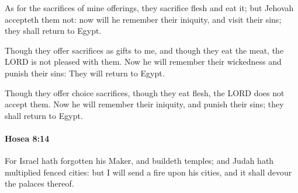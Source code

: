 			\begin{versebox}
					\item[BHS] 
					\item[LXX] 
					\item[ASV] As for the sacrifices of mine offerings, they sacrifice flesh and eat it; but Jehovah accepteth them not: now will he remember their iniquity, and visit their sins; they shall return to Egypt.
					\item[NIV] Though they offer sacrifices as gifts to me, and though they eat the meat, the LORD is not pleased with them. Now he will remember their wickedness and punish their sins: They will return to Egypt.
					\item[NRSV] Though they offer choice sacrifices, though they eat flesh, the LORD does not accept them. Now he will remember their iniquity, and punish their sins; they shall return to Egypt.
			\end{versebox}

		\paragraph{Hosea 8:14} %
			\label{HOSEA-8-14}

			For Israel hath forgotten his Maker, and buildeth temples; and Judah hath multiplied fenced cities: but I will send a fire upon his cities, and it shall devour the palaces thereof.

